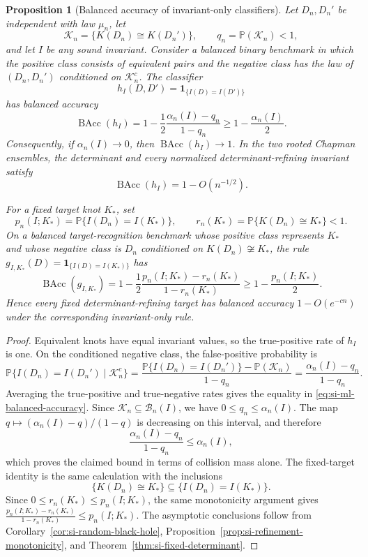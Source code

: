 \documentclass[9pt,twoside]{pnas-new}
\newtheorem{proposition}[theorem]{Proposition}
\theoremstyle{definition}
\theoremstyle{remark}
\renewcommand{\Pr}{\mathbb{P}}
\begin{document}
\begin{proposition}[Balanced accuracy of invariant-only classifiers]
\label{prop:si-ml-shortcut}
Let $D_n,D_n'$ be independent with law $\mu_n$, let
\[
 \mathcal K_n=\{K(D_n)\cong K(D_n')\},
 \qquad q_n=\Pr(\mathcal K_n)<1,
\]
and let $I$ be any sound invariant.  Consider a balanced binary benchmark in which the positive class consists of equivalent pairs and the negative class has the law of $(D_n,D_n')$ conditioned on $\mathcal K_n^c$.  The classifier
\[
 h_I(D,D')=\mathbf 1_{\{I(D)=I(D')\}}
\]
has balanced accuracy
\begin{equation}
 \operatorname{BAcc}(h_I)
 =1-\frac12\frac{\alpha_n(I)-q_n}{1-q_n}
 \ge
 1-\frac{\alpha_n(I)}{2}.
 \label{eq:si-ml-balanced-accuracy}
\end{equation}
Consequently, if $\alpha_n(I)\to0$, then $\operatorname{BAcc}(h_I)\to1$.  In the two rooted Chapman ensembles, the determinant and every normalized determinant-refining invariant satisfy
\[
 \operatorname{BAcc}(h_I)=1-O(n^{-1/2}).
\]

For a fixed target knot $K_*$, set
\[
 p_n(I;K_*)=\Pr\{I(D_n)=I(K_*)\},
 \qquad
 r_n(K_*)=\Pr\{K(D_n)\cong K_*\}<1.
\]
On a balanced target-recognition benchmark whose positive class represents $K_*$ and whose negative class is $D_n$ conditioned on $K(D_n)\not\cong K_*$, the rule $g_{I,K_*}(D)=\mathbf 1_{\{I(D)=I(K_*)\}}$ has
\begin{equation}
 \operatorname{BAcc}(g_{I,K_*})
 =1-\frac12\frac{p_n(I;K_*)-r_n(K_*)}{1-r_n(K_*)}
 \ge 1-\frac{p_n(I;K_*)}{2}.
 \label{eq:si-ml-fixed-target-accuracy}
\end{equation}
Hence every fixed determinant-refining target has balanced accuracy $1-O(e^{-cn})$ under the corresponding invariant-only rule.
\end{proposition}

\begin{proof}
Equivalent knots have equal invariant values, so the true-positive rate of $h_I$ is one.  On the conditioned negative class, the false-positive probability is
\[
 \Pr\{I(D_n)=I(D_n')\mid\mathcal K_n^c\}
 =\frac{\Pr\{I(D_n)=I(D_n')\}-\Pr(\mathcal K_n)}{1-q_n}
 =\frac{\alpha_n(I)-q_n}{1-q_n}.
\]
Averaging the true-positive and true-negative rates gives the equality in \eqref{eq:si-ml-balanced-accuracy}.  Since $\mathcal K_n\subseteq\mathcal B_n(I)$, we have $0\le q_n\le\alpha_n(I)$.  The map $q\mapsto(\alpha_n(I)-q)/(1-q)$ is decreasing on this interval, and therefore
\[
 \frac{\alpha_n(I)-q_n}{1-q_n}
 \le \alpha_n(I),
\]
which proves the claimed bound in terms of collision mass alone.  The fixed-target identity is the same calculation with the inclusions
\[
 \{K(D_n)\cong K_*\}
 \subseteq
 \{I(D_n)=I(K_*)\}.
\]
Since $0\le r_n(K_*)\le p_n(I;K_*)$, the same monotonicity argument gives
$\frac{p_n(I;K_*)-r_n(K_*)}{1-r_n(K_*)}\le p_n(I;K_*)$.
The asymptotic conclusions follow from Corollary~\ref{cor:si-random-black-hole}, Proposition~\ref{prop:si-refinement-monotonicity}, and Theorem~\ref{thm:si-fixed-determinant}.
\end{proof}
\end{document}
